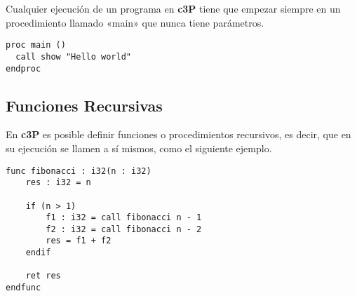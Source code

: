 Cualquier ejecución de un programa en \textbf{c3P} tiene que empezar siempre en
un procedimiento llamado «main» que nunca tiene parámetros.

\begin{verbatim}
proc main ()
  call show "Hello world"
endproc
\end{verbatim}

\subsection{Funciones Recursivas}

En \textbf{c3P} es posible definir funciones o procedimientos recursivos,
es decir, que en su ejecución se llamen a sí mismos, como el siguiente ejemplo.

\begin{verbatim}
func fibonacci : i32(n : i32)
    res : i32 = n

    if (n > 1)
        f1 : i32 = call fibonacci n - 1
        f2 : i32 = call fibonacci n - 2
        res = f1 + f2
    endif

    ret res
endfunc
\end{verbatim}
